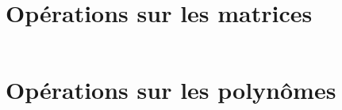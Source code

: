\documentclass[10pt]{article}
\begin{document}
  \subsection{}
   \inputminted[linenos,firstnumber=35,firstline=35,lastline=39]{matlab}{un.m}
  \subsection{}
   \inputminted[linenos,firstnumber=40,firstline=40,lastline=45]{matlab}{un.m}

 \section{Opérations sur les matrices}
  \inputminted[linenos,firstnumber=46,firstline=46,lastline=62]{matlab}{un.m}

 \section{Opérations sur les polynômes}
  \subsection{}
   \inputminted[linenos,firstnumber=63,firstline=63,lastline=66]{matlab}{un.m}

  \subsection{}
   \inputminted[linenos,firstnumber=67,firstline=67,lastline=69]{matlab}{un.m}

  \subsection{}
   \inputminted[linenos,firstnumber=70,firstline=70,lastline=72]{matlab}{un.m}

  \subsection{}
   \inputminted[linenos,firstnumber=73,firstline=73,lastline=75]{matlab}{un.m}

  \subsection{}
   \inputminted[linenos,firstnumber=76,firstline=76,lastline=80]{matlab}{un.m}

  \subsection{}
   \inputminted[linenos,firstnumber=81,firstline=81,lastline=82]{matlab}{un.m}
\end{document}
